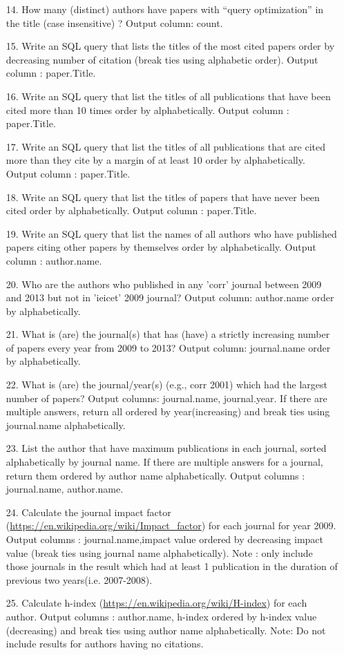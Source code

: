 \documentclass[10pt]{article}
\begin{document}
\begin{enumerate}
\item
[14.] How many (distinct) authors have papers with “query optimization” in the title (case insensitive) ? Output column: count.
\item
[15.] Write an SQL query that lists the titles of the most cited papers order by decreasing number of citation (break ties using alphabetic order). Output column : paper.Title.
\item
[16.] Write an SQL query that  list the titles of all publications that have been cited more than 10 times order by alphabetically. Output column : paper.Title.
\item
[17.] Write an SQL query that list the titles of all publications that are cited more than they cite by a margin of at least 10 order by alphabetically. Output column : paper.Title.
\item
[18.] Write an SQL query that list the titles of papers that have never been cited order by alphabetically. Output column : paper.Title.
\item
[19.] Write an SQL query that list the names of all authors who have published papers citing other papers by themselves order by alphabetically. Output column : author.name.
\item
[20.] Who are the authors who published in any 'corr' journal between 2009 and 2013 but not in 'ieicet' 2009 journal? Output column: author.name order by alphabetically.
\item
[21.] What is (are) the journal(s) that has (have) a strictly increasing number of papers every year from 2009 to 2013? Output column: journal.name order by alphabetically.
\item
[22.] What is (are) the journal/year(s) (e.g., corr 2001) which had the largest number of papers? Output columns: journal.name, journal.year. If there are multiple answers, return all ordered by year(increasing) and break ties using journal.name alphabetically.
\item
[23.] List the author that have maximum publications in each journal, sorted alphabetically by journal name. If there are multiple answers for a journal, return them ordered by author name alphabetically. Output columns : journal.name, author.name.
\item
[24.] Calculate the journal impact factor (\url{https://en.wikipedia.org/wiki/Impact_factor}) for each journal for year 2009. Output columns : journal.name,impact value ordered by decreasing impact value (break ties using journal name alphabetically). Note : only include those journals in the result which had at least 1 publication in the duration of previous two years(i.e. 2007-2008).
\item
[25.] Calculate h-index (\url{https://en.wikipedia.org/wiki/H-index}) for each author. Output columns : author.name, h-index ordered by h-index value (decreasing) and break ties using author name alphabetically. Note: Do not include results for authors having no citations.

\end{enumerate}
\end{document}
